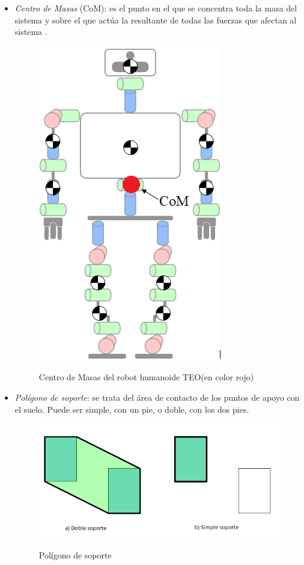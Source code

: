 \begin{itemize}
\item \emph{Centro de Masas} (CoM): es el punto en el que se concentra toda la masa del sistema y sobre el que actúa la resultante de todas las fuerzas que afectan al sistema \cite{ref9}.

\begin{figure}[H]
\centering
{\includegraphics[scale=0.5]{imagenes/apartado_2/215_center_of_mass}}
\caption{Centro de Masas del robot humanoide TEO(en color rojo)}
\label{figura215}
\end{figure}

\item \emph{Polígono de soporte}: se trata del área de contacto de los puntos de apoyo con el suelo. Puede ser simple, con un pie, o doble, con los dos pies.

\begin{figure}[H]
\centering
{\includegraphics[scale=0.6]{imagenes/apartado_2/216_supportpolygon}}
\caption{Polígono de soporte}
\label{figura216}
\end{figure}


\end{itemize}

